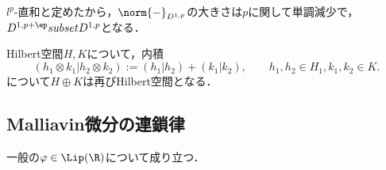 \documentclass[uplatex,dvipdfmx]{jsreport}
\begin{document}
\begin{remark}[包含関係について]
    $l^p$-直和と定めたから，$\norm{-}_{D^{1,p}}$の大きさは$p$に関して単調減少で，
    $D^{1,p+\ep}subset D^{1,p}$となる．
\end{remark}

\begin{lemma}
    Hilbert空間$H,K$について，内積
    \[(h_1\otimes k_1|h_2\otimes k_2):=(h_1|h_2)+(k_1|k_2),\qquad h_1,h_2\in H_1,k_1,k_2\in K.\]
    について$H\oplus K$は再びHilbert空間となる．
\end{lemma}

\subsection{Malliavin微分の連鎖律}

\begin{tcolorbox}[colframe=ForestGreen, colback=ForestGreen!10!white,breakable,colbacktitle=ForestGreen!40!white,coltitle=black,fonttitle=\bfseries\sffamily,
title=]
    一般の$\varphi\in\Lip(\R)$について成り立つ．
\end{tcolorbox}
\end{document}
